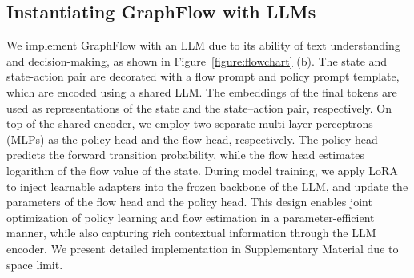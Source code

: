 \subsection{Instantiating GraphFlow with LLMs}
\label{instantiation}
We implement GraphFlow with an LLM due to its ability of text understanding and decision-making, as shown in Figure~\ref{figure:flowchart} (b).
The state and state-action pair are decorated with a flow prompt and policy prompt template, which are encoded using a shared LLM.
The embeddings of the final tokens are used as representations of the state and the state–action pair, respectively.
On top of the shared encoder, we employ two separate multi-layer perceptrons (MLPs) as the policy head and the flow head, respectively. 
The policy head predicts the forward transition probability, while the flow head estimates logarithm of the flow value of the state. 
During model training, we apply LoRA~\cite{hu2022lora} to inject learnable adapters into the frozen backbone of the LLM, and update the parameters of the flow head and the policy head. 
This design enables joint optimization of policy learning and flow estimation in a parameter-efficient manner, while also capturing rich contextual information through the LLM encoder. 
We present detailed implementation in Supplementary Material due to space limit.







